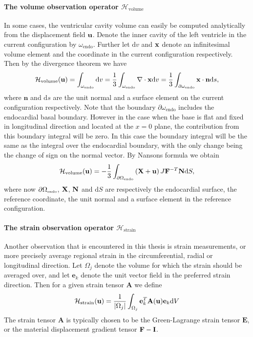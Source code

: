 \paragraph{The volume observation operator
  $\mathcal{H}_{\mathrm{volume}}$}
In some cases, the ventricular cavity volume can easily be computed
analytically from the displacement field $\mathbf{u}$. Denote the inner
cavity of the left ventricle in the current configuration by
$\omega_{\mathrm{endo}}$. Further let $\mathrm{d} v$ and $\mathbf{x}$
denote an infinitesimal volume element and the coordinate in the
current configuration respectively. Then by the divergence theorem we have
\begin{align}
  \mathcal{H}_{\mathrm{volume}}(\mathbf{u})= \int_{\omega_{\mathrm{endo}}} \mathrm{d} v =
  \frac{1}{3}\int_{\omega_{\mathrm{endo}}} \nabla \cdot \mathbf{x} \mathrm{d} v =
  \frac{1}{3}\int_{\partial \omega_{\mathrm{endo}}} \mathbf{x} \cdot \mathbf{n} \mathrm{d} s, 
\end{align}
where $\mathbf{n}$ and $\mathrm{d} s$ are the unit normal and a surface
element on the current configuration respectively.
Note that the boundary $\partial \omega_{\mathrm{endo}}$ includes the
endocardial basal boundary. However in the case when the base is flat
and fixed in longitudinal direction and located at the $x=0$ plane,
the contribution from this boundary integral will be zero. In this case the boundary integral
will be the same as the integral over the endocardial boundary, with
the only change being the change of sign on the normal vector. By
Nansons formula we obtain 
\begin{align}
  \mathcal{H}_{\mathrm{volume}}(\mathbf{u})= -\frac{1}{3}\int_{\partial \Omega_{ \textnormal{\tiny \text{endo}}}} \left( \mathbf{X} + \mathbf{u} \right) J \mathbf{F}^{-T} \mathbf{N} \mathrm{d}S,
  \label{eq:volume_operator}
\end{align}
where now $\partial \Omega_{ \textnormal{\tiny \text{endo}}}$,  $\mathbf{X}$, $\mathbf{N}$ and $\mathrm{d}S$ are respectively the
endocardial surface, the reference coordinate, the unit normal and a
surface element in the reference configuration.


\paragraph{The strain observation operator
  $\mathcal{H}_{\mathrm{strain}}$}
Another observation that is encountered in this thesis is strain
measurements, or more precisely average regional strain in the
circumferential, radial or longitudinal direction. Let $\Omega_j$
denote the volume for which the strain should be averaged over, and
let $\mathbf{e}_k$ denote the unit vector field in the preferred strain
direction. Then for a given strain tensor $\mathbf{A}$ we define 
\begin{align}
  \mathcal{H}_{\mathrm{strain}}(\mathbf{u}) = \frac{1}{|\Omega_j|}\int_{\Omega_j} \mathbf{e}_k^T \mathbf{A}(\mathbf{u}) \mathbf{e}_k  \mathrm{d}V
\end{align}
The strain tensor $ \mathbf{A}$ is typically chosen to be the
Green-Lagrange strain tensor $\mathbf{E}$, or
the material displacement gradient tensor $\mathbf{F} - \mathbf{I}$.


